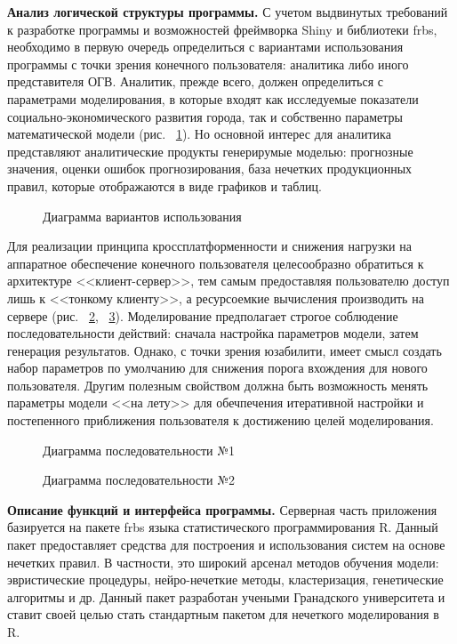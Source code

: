 \textbf{Анализ логической структуры программы.}
С учетом выдвинутых требований к разработке программы и возможностей фреймворка
Shiny и библиотеки frbs, необходимо в первую очередь определиться с вариантами
использования программы с точки зрения конечного пользователя: аналитика либо
иного представителя ОГВ. Аналитик, прежде всего, должен определиться с
параметрами моделирования, в которые входят как исследуемые показатели
социально-экономического развития города, так и собственно параметры
математической модели (рис. ~\ref{figure:usecase1}). Но основной интерес для
аналитика представляют аналитические продукты генерирумые моделью: прогнозные
значения, оценки ошибок прогнозирования, база нечетких продукционных правил,
которые отображаются в виде графиков и таблиц.
\begin{figure}[bhtp]
    \caption{Диаграмма вариантов использования}		
    \label{figure:usecase1}
\end{figure}
Для реализации принципа кроссплатформенности и снижения нагрузки на аппаратное
обеспечение конечного пользователя целесообразно обратиться к архитектуре
<<клиент-сервер>>, тем самым предоставляя пользователю доступ лишь к <<тонкому
клиенту>>, а ресурсоемкие вычисления производить на сервере (рис.
~\ref{figure:sequence1}, ~\ref{figure:sequence2}). Моделирование предполагает
строгое соблюдение последовательности действий: сначала настройка параметров
модели, затем генерация результатов. Однако, с точки зрения юзабилити, имеет
смысл создать набор параметров по умолчанию для снижения порога вхождения для
нового пользователя. Другим полезным свойством должна быть возможность менять
параметры модели <<на лету>> для обечпечения итеративной настройки и
постепенного приближения пользователя к достижению целей моделирования.
\begin{figure}[bhtp]
    \caption{Диаграмма последовательности №1}		
    \label{figure:sequence1}
\end{figure}

\begin{figure}[bhtp]
    \caption{Диаграмма последовательности №2}		
    \label{figure:sequence2}
\end{figure}

\textbf{Описание функций  и интерфейса программы.}
Серверная часть приложения базируется на пакете frbs языка статистического
программирования R. Данный пакет предоставляет средства для построения
и использования систем на основе нечетких правил. В частности, это широкий
арсенал методов обучения модели: эвристические процедуры, нейро-нечеткие методы,
кластеризация, генетические алгоритмы и др. Данный пакет разработан учеными
Гранадского университета и ставит своей целью стать стандартным пакетом для
нечеткого моделирования в R.

